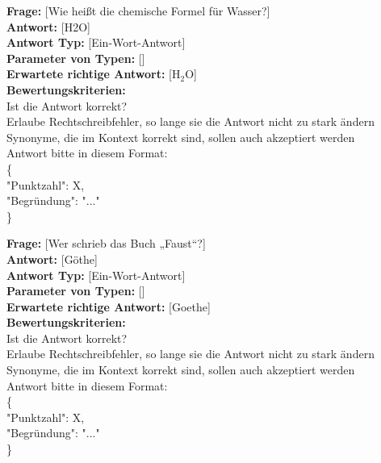 \documentclass[a4paper,12pt]{article}
\begin{document}
\textbf{Frage:} [Wie heißt die chemische Formel für Wasser?] \\
\textbf{Antwort:} [H2O] \\
\textbf{Antwort Typ:} [Ein-Wort-Antwort] \\
\textbf{Parameter von Typen:} [] \\
\textbf{Erwartete richtige Antwort:} [H$_2$O] \\
\textbf{Bewertungskriterien:} \\
Ist die Antwort korrekt? \\
Erlaube Rechtschreibfehler, so lange sie die Antwort nicht zu stark ändern \\
Synonyme, die im Kontext korrekt sind, sollen auch akzeptiert werden \\
Antwort bitte in diesem Format: \\
\{ \\
"Punktzahl": X, \\
"Begründung": "..." \\
\}

\vspace{1em}

\textbf{Frage:} [Wer schrieb das Buch „Faust“?] \\
\textbf{Antwort:} [Göthe] \\
\textbf{Antwort Typ:} [Ein-Wort-Antwort] \\
\textbf{Parameter von Typen:} [] \\
\textbf{Erwartete richtige Antwort:} [Goethe] \\
\textbf{Bewertungskriterien:} \\
Ist die Antwort korrekt? \\
Erlaube Rechtschreibfehler, so lange sie die Antwort nicht zu stark ändern \\
Synonyme, die im Kontext korrekt sind, sollen auch akzeptiert werden \\
Antwort bitte in diesem Format: \\
\{ \\
"Punktzahl": X, \\
"Begründung": "..." \\
\}

\vspace{1em}
\end{document}
